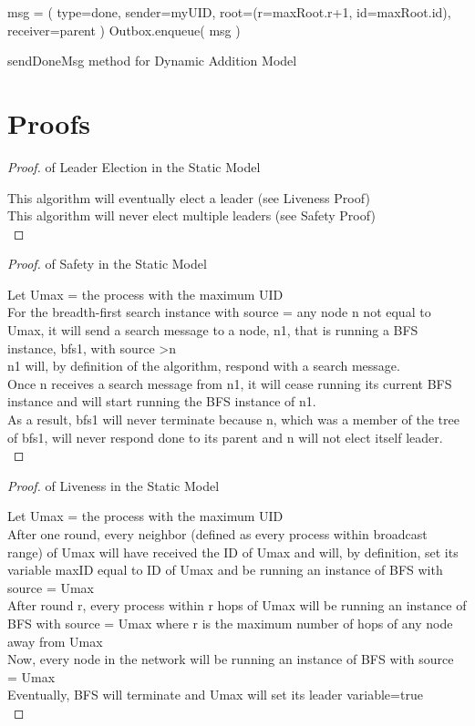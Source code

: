 \documentclass[english]{article}
\begin{document}
\begin{algorithm}
  msg = ( type=done, sender=myUID, root=(r=maxRoot.r+1, id=maxRoot.id), receiver=parent ) \;
  Outbox.enqueue( msg ) \;
  \caption{sendDoneMsg method for Dynamic Addition Model}
\end{algorithm}

\section{Proofs}

\begin{proof} of Leader Election in the Static Model

  This algorithm will eventually elect a leader (see Liveness Proof) \\
  This algorithm will never elect multiple leaders (see Safety Proof) \\

\end{proof}

\begin{proof} of Safety in the Static Model

  Let Umax = the process with the maximum UID  \\
  For the breadth-first search instance with source = any node n not equal to Umax, it will send a search message to a node, n1, that is running a BFS instance, bfs1, with source \textgreater n \\
  n1 will, by definition of the algorithm, respond with a search message. \\
  Once n receives a search message from n1, it will cease running its current BFS instance and will start running the BFS instance of n1. \\
  As a result, bfs1 will never terminate because n, which was a member of the tree of bfs1, will never respond done to its parent and n will not elect itself leader. \\

\end{proof}

\begin{proof} of Liveness in the Static Model

  Let Umax = the process with the maximum UID  \\
  After one round, every neighbor (defined as every process within broadcast range) of Umax will have received the ID of Umax and will, by definition, set its variable maxID equal to ID of Umax and be running an instance of BFS with source = Umax \\
  After round r, every process within r hops of Umax will be running an instance of BFS with source = Umax where r is the maximum number of hops of any node away from Umax \\
  Now, every node in the network will be running an instance of BFS with source = Umax \\
  Eventually, BFS will terminate and Umax will set its leader variable=true \\

\end{proof}
\end{document}
